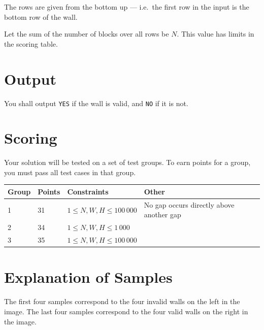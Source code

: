 The rows are given from the bottom up --- i.e.\ the first row in the input is the bottom row of the wall.

Let the sum of the number of blocks over all rows be $N$.
This value has limits in the scoring table.

\section*{Output}
You shall output \texttt{YES} if the wall is valid, and \texttt{NO} if it is not.

\section*{Scoring}
Your solution will be tested on a set of test groups. To earn points for a group, you must pass all test cases in that group.

\noindent
\begin{tabular}{| l | l | l | l |}
\hline
Group & Points & Constraints & Other \\ \hline
1     & 31         & $1 \le N, W, H \le 100\,000$ & No gap occurs directly above another gap \\ \hline
2     & 34         & $1 \le N, W, H \le 1\,000$ & \\ \hline
3     & 35         & $1 \le N, W, H \le 100\,000$ & \\ \hline
\end{tabular}

\section*{Explanation of Samples}
The first four samples correspond to the four invalid walls on the left in the image.
The last four samples correspond to the four valid walls on the right in the image.
